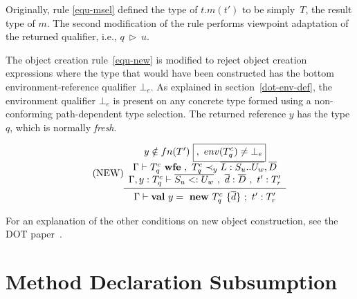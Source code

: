 \vspace{0.4cm}

Originally, rule \ref{equ-msel} defined the type of \mbox{$t.m(t')$}
to be simply~$T$, the result type of $m$.
The second modification of the rule performs viewpoint adaptation
of the returned qualifier, i.e., \mbox{$q\ \triangleright\ u$}.

The object creation rule~\ref{equ-new} is modified to reject object
creation expressions where the type that would have been constructed
has the bottom environment-reference qualifier \mbox{$\bot_e$}.
As explained in section~\ref{dot-env-def}, the environment qualifier \mbox{$\bot_e$}
is present on any concrete type formed using a non-conforming path-dependent
type selection.
The returned reference $y$ has the type $q$, which is normally {\em fresh}.

\begin{equation*}\tag{NEW}\label{equ-new}
\begin{array}{c}
y \notin fn(T')\ \boxed{,\ env(T_q^c) \neq \bot_e} \\
\Gamma \vdash T_q^c \ {\bf wfe}\ ,\ T_q^c \prec_y \overline{L : S_u .. U_w},\overline{D} \\
\Gamma, y : T_q^c \vdash \overline{S_u <: U_w}\ ,\ \overline{d} : \overline{D}\ ,\ t' : T_r' \\
\midrule
\Gamma \vdash {\bf val}\ y =\ {\bf new}\ T_q^c\ \{\overline{d}\}\ ;\ t' : T_r' \\
\end{array}
\end{equation*}

\vspace{0.4cm}

For an explanation of the other conditions on new object construction,
see the DOT paper~\cite{dot}.

\section{Method Declaration Subsumption} \label{dot-meth-decl-sub}


